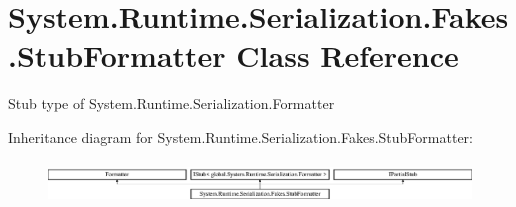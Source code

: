 \hypertarget{class_system_1_1_runtime_1_1_serialization_1_1_fakes_1_1_stub_formatter}{\section{System.\-Runtime.\-Serialization.\-Fakes.\-Stub\-Formatter Class Reference}
\label{class_system_1_1_runtime_1_1_serialization_1_1_fakes_1_1_stub_formatter}
}


Stub type of System.\-Runtime.\-Serialization.\-Formatter 


Inheritance diagram for System.\-Runtime.\-Serialization.\-Fakes.\-Stub\-Formatter\-:\begin{figure}[H]
\begin{center}
\leavevmode
\includegraphics[height=1.134752cm]{class_system_1_1_runtime_1_1_serialization_1_1_fakes_1_1_stub_formatter}
\end{center}
\end{figure}
